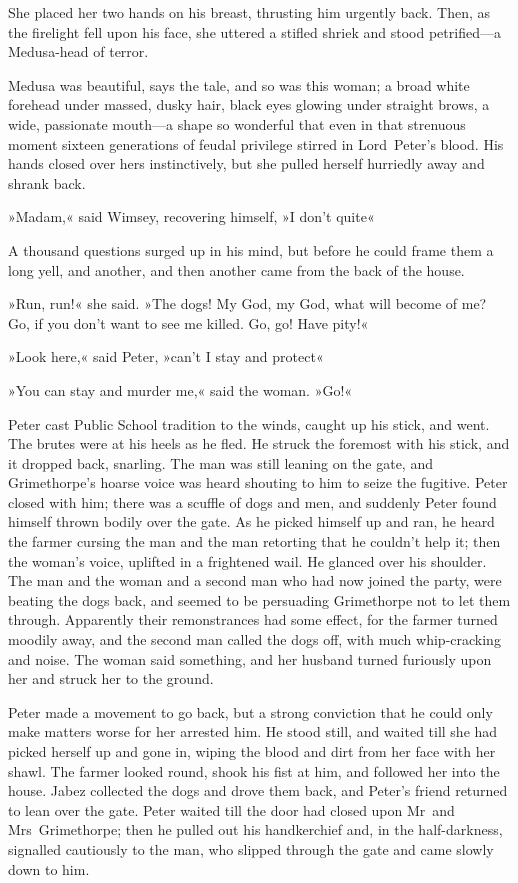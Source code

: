She placed her two hands on his breast, thrusting him urgently back.  Then, as the firelight fell upon his face, she uttered a stifled shriek and stood petrified—a Medusa-head of terror.

Medusa was beautiful, says the tale, and so was this woman; a broad white forehead under massed, dusky hair, black eyes glowing under straight brows, a wide, passionate mouth—a shape so wonderful that even in that strenuous moment sixteen generations of feudal privilege stirred in Lord~Peter's blood. His hands closed over hers instinctively, but she pulled herself hurriedly away and shrank back.

»Madam,« said Wimsey, recovering himself, »I don't quite\longdash«

A thousand questions surged up in his mind, but before he could frame them a long yell, and another, and then another came from the back of the house.

»Run, run!« she said. »The dogs! My God, my God, what will become of me? Go, if you don't want to see me killed. Go, go! Have pity!«

»Look here,« said Peter, »can't I stay and protect\longdash«

»You can stay and murder me,« said the woman. »Go!«

Peter cast Public School tradition to the winds, caught up his stick, and went. The brutes were at his heels as he fled. He struck the foremost with his stick, and it dropped back, snarling. The man was still leaning on the gate, and Grimethorpe's hoarse voice was heard shouting to him to seize the fugitive. Peter closed with him; there was a scuffle of dogs and men, and suddenly Peter found himself thrown bodily over the gate. As he picked himself up and ran, he heard the farmer cursing the man and the man retorting that he couldn't help it; then the woman's voice, uplifted in a frightened wail. He glanced over his shoulder. The man and the woman and a second man who had now joined the party, were beating the dogs back, and seemed to be persuading Grimethorpe not to let them through. Apparently their remonstrances had some effect, for the farmer turned moodily away, and the second man called the dogs off, with much whip-cracking and noise. The woman said something, and her husband turned furiously upon her and struck her to the ground.

Peter made a movement to go back, but a strong conviction that he could only make matters worse for her arrested him. He stood still, and waited till she had picked herself up and gone in, wiping the blood and dirt from her face with her shawl. The farmer looked round, shook his fist at him, and followed her into the house. Jabez collected the dogs and drove them back, and Peter's friend returned to lean over the gate.
Peter waited till the door had closed upon Mr~and Mrs~Grimethorpe; then he pulled out his handkerchief and, in the half-darkness, signalled cautiously to the man, who slipped through the gate and came slowly down to him.

